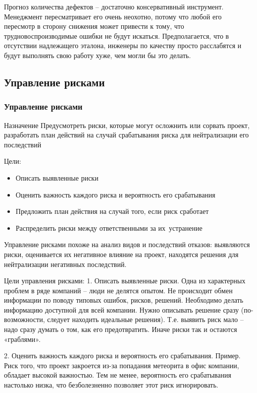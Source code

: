 \documentclass{../industrial-development}
\begin{document}
Прогноз количества дефектов – достаточно консервативный инструмент. Менеджмент пересматривает его очень неохотно, потому что любой его пересмотр в сторону снижения может привести к тому, что трудновоспроизводимые ошибки не будут искаться. Предполагается, что в отсутствии надлежащего эталона, инженеры по качеству просто расслабятся и будут выполнять свою работу хуже, чем могли бы это делать.

\subsection{Управление рисками}
\begin{frame} \frametitle{Управление рисками}
	\begin{block}{Назначение}
		Предусмотреть риски, которые могут осложнить или сорвать проект, разработать план действий на случай срабатывания риска для нейтрализации его последствий
	\end{block}
	Цели:
	\begin{itemize}
		\item Описать выявленные риски
		\item Оценить важность каждого риска и вероятность его срабатывания
		\item Предложить план действия на случай того, если риск сработает
		\item Распределить риски между ответственными за их~устранение
	\end{itemize}
\end{frame}
\lecturenotes
Управление рисками похоже на анализ видов и последствий отказов: выявляются риски, оценивается их негативное влияние на проект, находятся решения для нейтрализации негативных последствий.

Цели управления рисками:
1. Описать выявленные риски.
Одна из характерных проблем в ряде компаний – люди не делятся опытом. Не происходит обмен информации по поводу типовых ошибок, рисков, решений. Необходимо делать информацию доступной для всей компании.
Нужно описывать решение сразу (по-возможности, следует находить идеальные решения). Т.е. выявить риск мало – надо сразу думать о том, как его предотвратить. Иначе риски так и остаются «граблями».

2. Оценить важность каждого риска и вероятность его срабатывания.
Пример. Риск того, что проект закроется из-за попадания метеорита в офис компании, обладает высокой важностью. Тем не менее, вероятность его срабатывания настолько низка, что безболезненно позволяет этот риск игнорировать.
\end{document}
